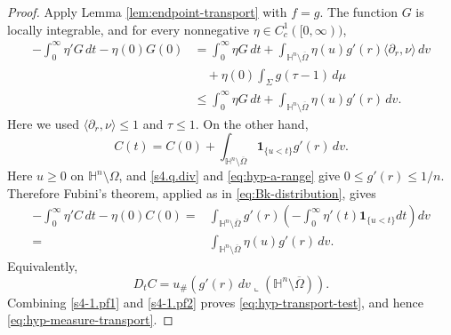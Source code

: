 \documentclass[11pt,reqno]{amsart}
\numberwithin{equation}{section}
\theoremstyle{definition}
\newcommand{\HH}{\mathbb H}
\begin{document}
\begin{proof}
Apply Lemma \ref{lem:endpoint-transport} with $f=g$.  The function $G$ is locally integrable, and for every nonnegative $\eta\in C_c^1([0,\infty))$,
\begin{align}\label{s4-1.pf1}
    -\int_0^\infty\eta'G\,dt-\eta(0)G(0)
    &=\int_0^\infty\eta G\,dt
      +\int_{\HH^n\setminus\overline\Omega}
       \eta(u)g'(r)\langle\partial_r,\nu\rangle\,dv\nonumber\\
    &\quad+\eta(0)\int_\Sigma g(\tau-1)\,d\mu\nonumber\\
    &\leq\int_0^\infty\eta G\,dt
      +\int_{\HH^n\setminus\overline\Omega}\eta(u)g'(r)\,dv.
\end{align}
Here we used $\langle\partial_r,\nu\rangle\leq1$ and $\tau\leq1$.  On the other hand,
\begin{equation*}
    C(t)=C(0)+\int_{\HH^n\setminus\overline\Omega}
      \mathbf 1_{\{u<t\}}g'(r)\,dv.
\end{equation*}
Here $u\geq0$ on $\HH^n\setminus\Omega$, and \eqref{s4.q.div} and \eqref{eq:hyp-a-range} give $0\leq g'(r)\leq1/n$.  Therefore Fubini's theorem, applied as in \eqref{eq:Bk-distribution}, gives
\begin{align}\label{s4-1.pf2}
    -\int_0^\infty\eta'C\,dt-\eta(0)C(0)
    =&\int_{\HH^n\setminus\overline\Omega}g'(r)\left(-\int_0^\infty \eta'(t)\mathbf 1_{\{u<t\}}dt\right)dv\nonumber\\
   =& \int_{\HH^n\setminus\overline\Omega}\eta(u)g'(r)\,dv.
\end{align}
Equivalently,
\begin{equation*}
    D_tC
    =
    u_\#\left(
      g'(r)\,dv\mathbin{\llcorner}
      (\mathbb H^n\setminus\overline\Omega)
    \right).
\end{equation*}
Combining \eqref{s4-1.pf1} and \eqref{s4-1.pf2} proves
\eqref{eq:hyp-transport-test}, and hence
\eqref{eq:hyp-measure-transport}.
\end{proof}
\end{document}
